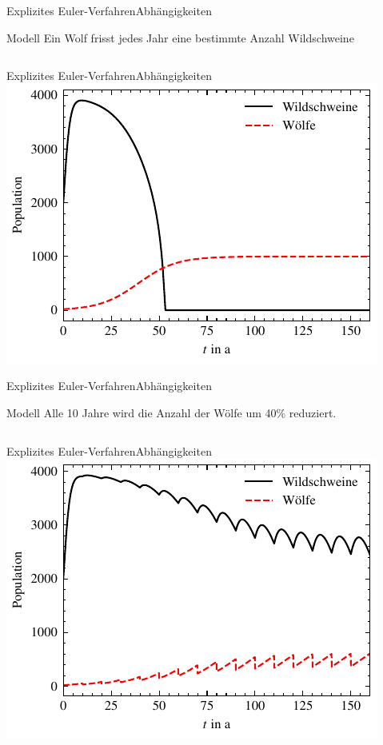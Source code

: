 \documentclass[xelatex,aspectratio=169]{beamer}
\begin{document}
\begin{frame}{Explizites Euler-Verfahren}{Abhängigkeiten}
    \begin{block}{Modell}
        Ein Wolf frisst jedes Jahr eine bestimmte Anzahl Wildschweine
    \end{block}
    \inputminted[firstline=19, lastline=23]{python}{src/sim_dependency_b.py}
\end{frame}

\begin{frame}{Explizites Euler-Verfahren}{Abhängigkeiten}
    \centering
    \includegraphics[height=.8\textheight]{fig/sim_dependency_b.pdf}
\end{frame}

\begin{frame}{Explizites Euler-Verfahren}{Abhängigkeiten}
    \begin{block}{Modell}
        Alle 10 Jahre wird die Anzahl der Wölfe um 40\% reduziert.
    \end{block}
    \inputminted[firstline=19, lastline=23]{python}{src/sim_dependency_c.py}
\end{frame}

\begin{frame}{Explizites Euler-Verfahren}{Abhängigkeiten}
    \centering
    \includegraphics[height=.8\textheight]{fig/sim_dependency_c.pdf}
\end{frame}
\end{document}
